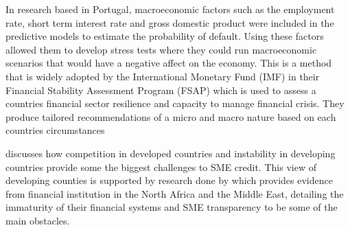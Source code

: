In \cite{antunes_estimating_2005} research based in Portugal, macroeconomic factors such as the employment rate, short term interest rate and gross domestic product were included in the predictive models to estimate the probability of default. Using these factors allowed them to develop stress tests where they could run macroeconomic scenarios that would have a negative affect on the economy. This is a method that is widely adopted by the International Monetary Fund (IMF) in their Financial Stability Assessment Program (FSAP) which is used to assess a countries financial sector resilience and capacity to manage financial crisis. They produce tailored recommendations of a micro and macro nature based on each countries circumstances \citep{marston_financial_2001} 

\cite{ardic_small_2011} discusses how competition in developed countries and instability in developing countries provide some the biggest challenges to SME credit. This view of developing counties is supported by research done by \cite{rocha_status_2011} which provides evidence from financial institution in the North Africa and the Middle East, detailing the immaturity of their financial systems and SME transparency to be some of the main obstacles. 

\begin{comment}
\subsubsection{Location/Geospatial Data in Predictive Modelling}
This will include details on location metrics and there use in predictive modelling. I will also be including details on what electoral divisions/local authorities are.
\end{comment}

